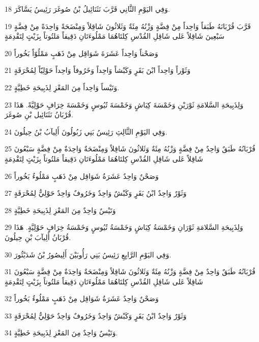 \par 18 وَفِي اليَوْمِ الثَّانِي قَرَّبَ نَثَنَائِيلُ بْنُ صُوغَرَ رَئِيسُ يَسَّاكَرَ.
\par 19 قَرَّبَ قُرْبَانَهُ طَبَقاً وَاحِداً مِنْ فِضَّةٍ وَزْنُهُ مِئَةٌ وَثَلاثُونَ شَاقِلاً وَمِنْضَحَةً وَاحِدَةً مِنْ فِضَّةٍ سَبْعِينَ شَاقِلاً عَلى شَاقِلِ القُدْسِ كِلتَاهُمَا مَمْلُوءَتَانِ دَقِيقاً مَلتُوتاً بِزَيْتٍ لِتَقْدِمَةٍ
\par 20 وَصَحْناً وَاحِداً عَشَرَةَ شَوَاقِل مِنْ ذَهَبٍ مَمْلُوّاً بَخُوراً
\par 21 وَثَوْراً وَاحِداً ابْنَ بَقَرٍ وَكَبْشاً وَاحِداً وَخَرُوفاً وَاحِداً حَوْلِيّاً لِمُحْرَقَةٍ
\par 22 وَتَيْساً وَاحِداً مِنَ المَعْزِ لِذَبِيحَةِ خَطِيَّةٍ.
\par 23 وَلِذَبِيحَةِ السَّلامَةِ ثَوْرَيْنِ وَخَمْسَةَ كِبَاشٍ وَخَمْسَةَ تُيُوسٍ وَخَمْسَةَ خِرَافٍ حَوْلِيَّةً. هَذَا قُرْبَانُ نَثَنَائِيل بْنِ صُوغَرَ.
\par 24 وَفِي اليَوْمِ الثَّالِثِ رَئِيسُ بَنِي زَبُولُونَ أَلِيآبُ بْنُ حِيلُونَ.
\par 25 قُرْبَانُهُ طَبَقٌ وَاحِدٌ مِنْ فِضَّةٍ وَزْنُهُ مِئَةٌ وَثَلاثُونَ شَاقِلاً وَمِنْضَحَةٌ وَاحِدَةٌ مِنْ فِضَّةٍ سَبْعُونَ شَاقِلاً عَلى شَاقِلِ القُدْسِ كِلتَاهُمَا مَمْلُوءَتَانِ دَقِيقاً مَلتُوتاً بِزَيْتٍ لِتَقْدِمَةٍ
\par 26 وَصَحْنٌ وَاحِدٌ عَشَرَةُ شَوَاقِل مِنْ ذَهَبٍ مَمْلُوءٌ بَخُوراً
\par 27 وَثَوْرٌ وَاحِدٌ ابْنُ بَقَرٍ وَكَبْشٌ وَاحِدٌ وَخَرُوفٌ وَاحِدٌ حَوْلِيٌّ لِمُحْرَقَةٍ
\par 28 وَتَيْسٌ وَاحِدٌ مِنَ المَعْزِ لِذَبِيحَةِ خَطِيَّةٍ
\par 29 وَلِذَبِيحَةِ السَّلامَةِ ثَوْرَانِ وَخَمْسَةُ كِبَاشٍ وَخَمْسَةُ تُيُوسٍ وَخَمْسَةُ خِرَافٍ حَوْلِيَّةٍ. هَذَا قُرْبَانُ أَلِيآبَ بْنِ حِيلُونَ.
\par 30 وَفِي اليَوْمِ الرَّابِعِ رَئِيسُ بَنِي رَأُوبَيْنَ أَلِيصُورُ بْنُ شَدَيْئُورَ.
\par 31 قُرْبَانُهُ طَبَقٌ وَاحِدٌ مِنْ فِضَّةٍ وَزْنُهُ مِئَةٌ وَثَلاثُونَ شَاقِلاً وَمِنْضَحَةٌ وَاحِدَةٌ مِنْ فِضَّةٍ سَبْعُونَ شَاقِلاً عَلى شَاقِلِ القُدْسِ كِلتَاهُمَا مَمْلُوءَتَانِ دَقِيقاً مَلتُوتاً بِزَيْتٍ لِتَقْدِمَةٍ
\par 32 وَصَحْنٌ وَاحِدٌ عَشَرَةُ شَوَاقِل مِنْ ذَهَبٍ مَمْلُوءٌ بَخُوراً
\par 33 وَثَوْرٌ وَاحِدٌ ابْنُ بَقَرٍ وَكَبْشٌ وَاحِدٌ وَخَرُوفٌ وَاحِدٌ حَوْلِيٌّ لِمُحْرَقَةٍ
\par 34 وَتَيْسٌ وَاحِدٌ مِنَ المَعْزِ لِذَبِيحَةِ خَطِيَّةٍ.
